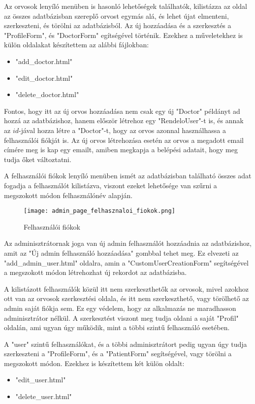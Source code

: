 Az orvosok lenyíló menüben is hasonló lehetőségek találhatók, kilistázza az oldal az összes adatbázisban szereplő orvost egymás alá, és lehet újat elmenteni, szerkeszteni, és törölni az adatbázisból. Az új hozzáadása és a szerkesztés a "ProfileForm", és "DoctorForm" egítségével történik. Ezekhez a műveletekhez is külön oldalakat készítettem az alábbi fájlokban:

\begin{itemize}
	\item "add\_doctor.html"
	\item "edit\_doctor.html"
	\item "delete\_doctor.html"
\end{itemize}

Fontos, hogy itt az új orvos hozzáadása nem csak egy új "Doctor" példányt ad hozzá az adatbázishoz, hanem először létrehoz egy "RendeloUser"-t is, és annak az $id$-jával hozza létre a "Doctor"-t, hogy az orvos azonnal használhassa a felhasználói fiókját is. Az új orvos létrehozása esetén az orvos a megadott email címére meg is kap egy emailt, amiben megkapja a belépési adatait, hogy meg tudja őket változtatni.

A felhasználói fiókok lenyíló menüben ismét az adatbázisban található összes adat fogadja a felhasználót kilistázva, viszont ezeket lehetősége van szűrni a megszokott módon felhasználónév alapján.

\begin{figure}[H]
	\caption{Felhasználói fiókok}
	\label{fig:felhasznaloifiokok}
	\centering
	\texttt{[image: admin\_page\_felhasznaloi\_fiokok.png]}
\end{figure}

Az adminisztrátornak joga van új admin felhasználót hozzáadnia az adatbázishoz, amit az "Új admin felhasználó hozzáadása" gombbal tehet meg. Ez elvezeti az "add\_admin\_user.html" oldalra, amin a "CustomUserCreationForm" segítségével a megszokott módon létrehozhat új rekordot az adatbázisba.

A kilistázott felhasználók közül itt nem szerkeszthetők az orvosok, mivel azokhoz ott van az orvosok szerkesztési oldala, és itt nem szerkeszthető, vagy törölhető az admin saját fiókja sem. Ez egy védelem, hogy az alkalmazás ne maradhasson adminisztrátor nélkül. A szerkesztést viszont meg tudja oldani a saját "Profil" oldalán, ami ugyan úgy működik, mint a többi szintű felhasználó esetében.

A "user" szintű felhasználókat, és a többi adminisztrátort pedig ugyan úgy tudja szerkeszteni a "ProfileForm", és a "PatientForm" segítségével, vagy törölni a megszokott módon. Ezekhez is készítettem két külön oldalt:

\begin{itemize}
	\item "edit\_user.html"
	\item "delete\_user.html"
\end{itemize}
